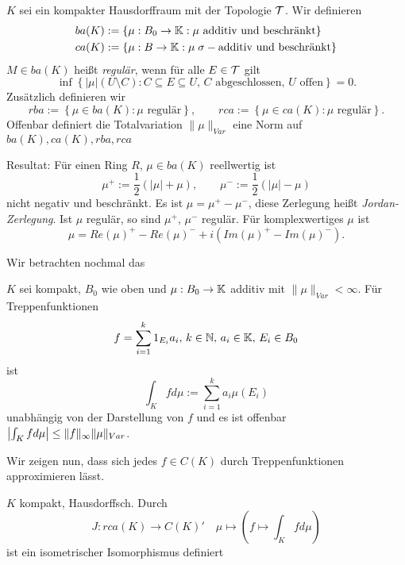 	\begin{definition}
	$K$ sei ein kompakter Hausdorffraum mit der Topologie $\mathcal{T}$. Wir definieren
	\begin{equation*}
		\begin{split}
		& ba(K) := \{\mu : B_0 \to \mathbb{K} : \mu \text{ additiv und beschränkt} \}\\
		& ca(K) := \{\mu : B \to \mathbb{K} : \mu\; \sigma-\text{additiv und beschränkt} \}
		\end{split}
	\end{equation*}
		$M\in ba(K)$ heißt \textit{regulär}, wenn für alle $E\in \mathcal{T}$ gilt
		$$\inf \left\lbrace |\mu| (U\setminus C) : C\subseteq E \subseteq U,\, C \text{ abgeschlossen, } U \text{ offen} \right\rbrace = 0.$$
		Zusätzlich definieren wir
		$$rba := \left\lbrace \mu \in ba(K) : \mu \text{ regulär}\right\rbrace,\qquad 
		rca := \left\lbrace \mu \in ca(K) : \mu \text{ regulär}\right\rbrace. $$
		Offenbar definiert die Totalvariation $\|\mu \|_{Var}$ eine Norm auf $ba(K), ca(K), rba, rca$
	\end{definition}	
	
	\begin{bem*}
	Resultat: Für einen Ring $R$, $\mu \in ba(K)$ reellwertig ist 
	$$\mu^+:=\frac{1}{2}(|\mu| + \mu),\qquad \mu^-:=\frac{1}{2}(|\mu| - \mu)$$
	nicht negativ und beschränkt.
	Es ist $\mu = \mu^+ - \mu^-$, diese Zerlegung heißt \textit{Jordan-Zerlegung}.
	Ist $\mu$ regulär, so sind $\mu^+,\,\mu^-$ regulär.
	Für komplexwertiges $\mu$ ist
	$$\mu = Re(\mu)^+ - Re(\mu)^- + i(Im(\mu)^+ -Im(\mu)^-).$$
	\end{bem*}
	
	Wir betrachten nochmal das 
	\begin{bem*}
		$K$ sei kompakt, $B_0$ wie oben und $\mu : B_0 \to \mathbb{K}$ additiv mit $\|\mu \|_{Var} < \infty$. Für Treppenfunktionen 
		$$f = \sum^k_{i=1} 1_{E_i} a_i,\, k\in\mathbb{N},\,a_i\in\mathbb{K},\,E_i\in B_0$$ 
		ist 
		$$\int_K f d\mu := \sum^k_{i=1} a_i \mu(E_i)$$
		unabhängig von der Darstellung von $f$ und es ist offenbar $\left\lvert \int_K fd\mu \right\rvert \leq \|f\|_\infty \|\mu \|_{Var}$. 
	\end{bem*}

	Wir zeigen nun, dass sich jedes $f \in C(K)$ durch Treppenfunktionen approximieren lässt.
	\todor[Approximation S.62f]
	\begin{thm}
		$K$ kompakt, Hausdorffsch. Durch
			$$ J: rca(K) \to C(K)' \quad \mu \mapsto (f\mapsto \int_K f d\mu)$$
		ist ein isometrischer Isomorphismus definiert
	\end{thm}
	
